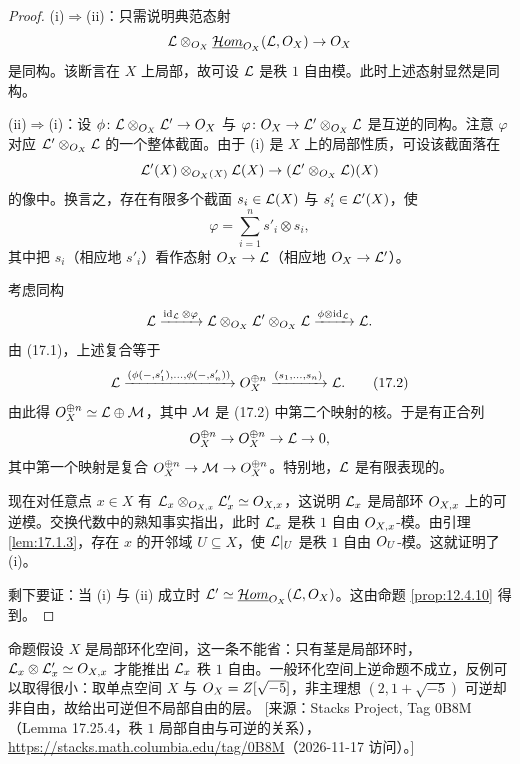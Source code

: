 \begin{proof}
(i)$\Rightarrow$(ii)：只需说明典范态射
\[
\mathcal{L}\otimes_{O_X}\underline{\mathcal{H}om}_{O_X}(\mathcal{L},O_X)\to O_X
\]
是同构。该断言在 $X$ 上局部，故可设 $\mathcal{L}$ 是秩 $1$ 自由模。此时上述态射显然是同构。

(ii)$\Rightarrow$(i)：设 $\phi\colon\mathcal{L}\otimes_{O_X}\mathcal{L}'\to O_X$ 与 $\varphi\colon O_X\to\mathcal{L}'\otimes_{O_X}\mathcal{L}$ 是互逆的同构。注意 $\varphi$ 对应 $\mathcal{L}'\otimes_{O_X}\mathcal{L}$ 的一个整体截面。由于 (i) 是 $X$ 上的局部性质，可设该截面落在
\[
\mathcal{L}'(X)\otimes_{O_X(X)}\mathcal{L}(X)\to(\mathcal{L}'\otimes_{O_X}\mathcal{L})(X)
\]
的像中。换言之，存在有限多个截面 $s_i\in\mathcal{L}(X)$ 与 $s'_i\in\mathcal{L}'(X)$，使
\begin{equation}
\varphi=\sum_{i=1}^{n}s'_i\otimes s_i, \tag{17.1}
\end{equation}
其中把 $s_i$（相应地 $s'_i$）看作态射 $O_X\to\mathcal{L}$（相应地 $O_X\to\mathcal{L}'$）。

考虑同构
\[
\mathcal{L}\xrightarrow{\operatorname{id}_{\mathcal{L}}\otimes\varphi}\mathcal{L}\otimes_{O_X}\mathcal{L}'\otimes_{O_X}\mathcal{L}\xrightarrow{\phi\otimes\operatorname{id}_{\mathcal{L}}}\mathcal{L}.
\]
由 (17.1)，上述复合等于
\begin{equation}
\mathcal{L}\xrightarrow{(\phi(-,s'_1),\dots,\phi(-,s'_n))}O_X^{\oplus n}\xrightarrow{(s_1,\dots,s_n)}\mathcal{L}. \tag{17.2}
\end{equation}
由此得 $O_X^{\oplus n}\simeq\mathcal{L}\oplus\mathcal{M}$，其中 $\mathcal{M}$ 是 (17.2) 中第二个映射的核。于是有正合列
\[
O_X^{\oplus n}\to O_X^{\oplus n}\to\mathcal{L}\to 0,
\]
其中第一个映射是复合 $O_X^{\oplus n}\to\mathcal{M}\to O_X^{\oplus n}$。特别地，$\mathcal{L}$ 是有限表现的。

现在对任意点 $x\in X$ 有 $\mathcal{L}_x\otimes_{O_{X,x}}\mathcal{L}'_x\simeq O_{X,x}$，这说明 $\mathcal{L}_x$ 是局部环 $O_{X,x}$ 上的可逆模。交换代数中的熟知事实指出，此时 $\mathcal{L}_x$ 是秩 $1$ 自由 $O_{X,x}$-模。由引理 \ref{lem:17.1.3}，存在 $x$ 的开邻域 $U\subseteq X$，使 $\mathcal{L}|_U$ 是秩 $1$ 自由 $O_U$-模。这就证明了 (i)。

剩下要证：当 (i) 与 (ii) 成立时 $\mathcal{L}'\simeq\underline{\mathcal{H}om}_{O_X}(\mathcal{L},O_X)$。这由命题 \ref{prop:12.4.10} 得到。
\end{proof}

\begin{yizhu}
命题假设 $X$ 是局部环化空间，这一条不能省：只有茎是局部环时，$\mathcal{L}_x\otimes\mathcal{L}'_x\simeq O_{X,x}$ 才能推出 $\mathcal{L}_x$ 秩 $1$ 自由。一般环化空间上逆命题不成立，反例可以取得很小：取单点空间 $X$ 与 $O_X=Z[\sqrt{-5}]$，非主理想 $(2,1+\sqrt{-5})$ 可逆却非自由，故给出可逆但不局部自由的层。
[来源：Stacks Project, Tag 0B8M（Lemma 17.25.4，秩 $1$ 局部自由与可逆的关系），\url{https://stacks.math.columbia.edu/tag/0B8M}（2026-11-17 访问）。]
\end{yizhu}

